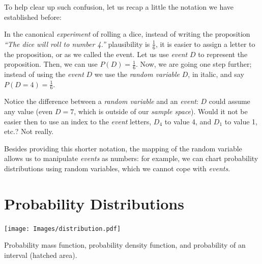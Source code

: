 \documentclass[
  letterpaper,
  12pt,
  british]{tufte-book}
\theoremstyle{plain}
\theoremstyle{plain}
\theoremstyle{definition}
\theoremstyle{remark}
\begin{document}
To help clear up such confusion, let us recap a little the notation we
have established before:

In the canonical \emph{experiment} of rolling a dice, instead of writing
the proposition \emph{``The dice will roll to number 4.''} plausibility
is \(\frac{1}{6}\), it is easier to assign a letter to the proposition,
or as we called the event. Let us use \emph{event} \(D\) to represent
the proposition. Then, we can use \(P(D)=\frac{1}{6}\). Now, we are
going one step further; instead of using the \emph{event} \(D\) we use
the \emph{random variable} \(\mathit{D}\), in italic, and say
\(P(\mathit{D}=4)=\frac{1}{6}\).

Notice the difference between a \emph{random variable} and an
\emph{event}: \(\mathit{D}\) could assume any
value (even \(\mathit{D}=7\), which is outside of our \emph{sample
space}). Would it not be easier then to use an index to the \emph{event}
letters, \(D_4\) to value 4, and \(D_1\) to value 1, etc.? Not really.

Besides providing this shorter notation, the mapping of the random
variable allows us to manipulate \emph{events} as numbers: for example,
we can chart probability distributions using random variables, which we
cannot cope with \emph{events}.

\hypertarget{probability-distributions}{%
\section{Probability Distributions}\label{probability-distributions}}

\begin{marginfigure}

{\centering \texttt{[image: Images/distribution.pdf]}

}

\caption{\label{fig-distribution}Probability mass function, probability
density function, and probability of an interval (hatched area).}

\end{marginfigure}
\end{document}

